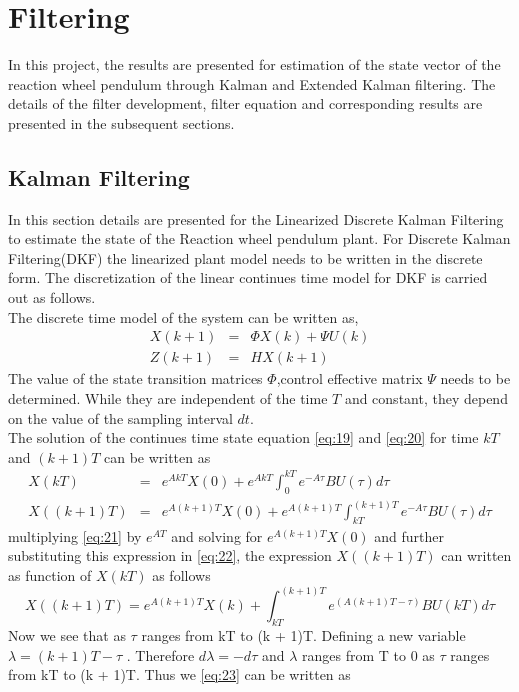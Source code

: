 \documentclass[a4paper]{article}
\begin{document}
\section{Filtering}
In this project, the results are presented for estimation of the state vector of the reaction wheel pendulum through Kalman and Extended Kalman filtering. The details of the filter development, filter equation and corresponding results are presented in the subsequent sections.
\subsection{Kalman Filtering}
In this section details are presented for the Linearized Discrete Kalman Filtering to estimate the state of the Reaction wheel pendulum plant.
For Discrete Kalman Filtering(DKF) the linearized plant model needs to be written in the discrete form. The discretization of the linear continues time model for DKF is carried out as follows.\\
The discrete time model of the system can be written as,
\begin{eqnarray}
X(k+1) &=& \Phi X(k) + \Psi U(k) \label{eq:17}\\
Z(k+1) &=& HX(k+1) \label{eq:18}
\end{eqnarray}  
The value of the state transition matrices $\Phi$,control effective matrix $\Psi$ needs to be determined. While they are independent of the time $T$ and constant, they depend on the value of the sampling interval $dt$.\\
The solution of the continues time state equation \ref{eq:19} and \ref{eq:20} for time $kT$ and $(k+1)T$ can be written as
\begin{eqnarray}
X(kT) &=& e^{AkT}X(0) + e^{AkT}\int_{0}^{kT} e^{-A\tau}BU(\tau)d\tau \label{eq:21}\\
X((k+1)T) &=& e^{A(k+1)T}X(0) + e^{A(k+1)T}\int_{kT}^{(k+1)T} e^{-A\tau}BU(\tau)d\tau \label{eq:22}
\end{eqnarray}
multiplying \ref{eq:21} by $e^{AT}$ and solving for $e^{A(k+1)T}X(0)$ and further substituting this expression in \ref{eq:22}, the expression $X((k+1)T)$ can written as function of $X(kT)$ as follows
\begin{equation}
X((k+1)T) = e^{A(k+1)T}X(k) + \int_{kT}^{(k+1)T} e^{(A(k+1)T-\tau)}BU(kT)d\tau
\label{eq:23}
\end{equation}
Now we see that as $\tau$ ranges from kT to (k + 1)T. Defining a new variable $\lambda = (k +1)T-\tau$ .
Therefore $ d\lambda = -d\tau$ and $\lambda$ ranges from T to 0 as $\tau$ ranges from kT to (k + 1)T. Thus we \ref{eq:23} can be written as
\end{document}
